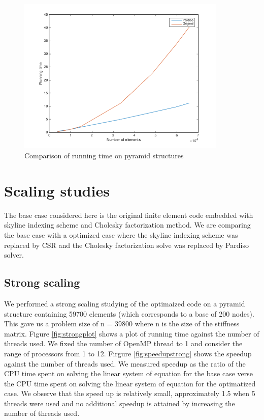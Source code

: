 \documentclass[11pt]{article}
\begin{document}
\begin{figure}[H]
\begin{center}

\includegraphics[width=10cm]{pyrplot}
\caption{Comparison of running time on pyramid structures}
\label{fig:pyr_comp}
\end{center}
\end{figure}


\section{Scaling studies}\label{sec:scaling}
The base case considered here is the original finite element code embedded with skyline indexing scheme and Cholesky factorization method. We are comparing the base case with a optimized case where the skyline indexing scheme was replaced by CSR and the Cholesky factorization solve was replaced by Pardiso solver. 

\subsection{Strong scaling}
We performed a strong scaling studying of the optimaized code on a pyramid structure containing 59700 elements (which corresponds to a base of 200 nodes). This gave us a problem size of n = 39800 where n is the size of the stiffness matrix. Figure \ref{fig:strongplot} shows a plot of running time against the number of threads used. We fixed the number of OpenMP thread to 1 and consider the range of processors from 1 to 12. Firgure \ref{fig:speedupstrong} shows the speedup against the number of threads used. We measured speedup as the ratio of the CPU time spent on solving the linear system of equation for the base case verse the CPU time spent on solving the linear system of equation for the optimatized case. We observe that the speed up is relatively small, approximately 1.5 when 5 threads were used and no additional speedup is attained by increasing the number of threads used. \\
\end{document}
